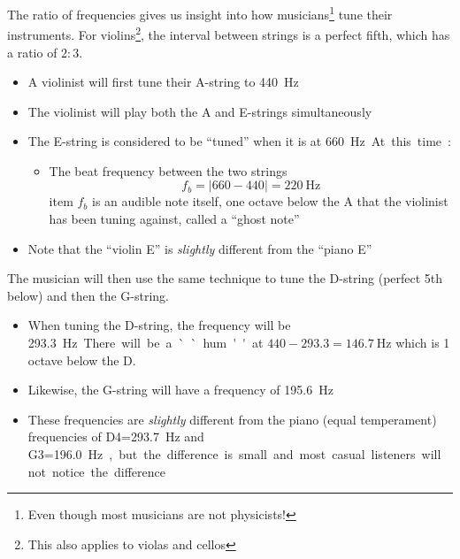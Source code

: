 The ratio of frequencies gives us insight into how musicians\footnote{Even
though most musicians are not physicists!} tune their instruments. For
violins\footnote{This also applies to violas and cellos}, the interval between
strings is a perfect fifth, which has a ratio of $2:3$.
\begin{itemize}
\item A violinist will first tune their A-string to \SI{440}\hertz
\item The violinist will play both the A and E-strings simultaneously
\item The E-string is considered to be ``tuned'' when it is at \SI{660}\hertz.
  At this time:
  \begin{itemize}
  \item The beat frequency between the two strings
    \begin{displaymath}
      f_b=|660-440|=\SI{220}\hertz
    \end{displaymath}
  item $f_b$ is an audible note itself, one octave below the A that the
  violinist has been tuning against, called a ``ghost note''
  \end{itemize}
\item Note that the ``violin E'' is \emph{slightly} different from the
  ``piano E''
\end{itemize}
%
%
%
%
The musician will then use the same technique to tune the D-string (perfect 5th
below) and then the G-string.
\begin{itemize}
\item When tuning the D-string, the frequency will be \SI{293.3}\hertz.
  There will be a ``hum'' at $440-293.3=\SI{146.7}\hertz$ which is 1 octave
  below the D.
\item Likewise, the G-string will have a frequency of \SI{195.6}\hertz
\item These frequencies are \emph{slightly} different from the piano (equal
  temperament) frequencies of D4=\SI{293.7}{\hertz} and
  G3=\SI{196.0}\hertz, but the difference is small and most casual listeners
  will not notice the difference
\end{itemize}


